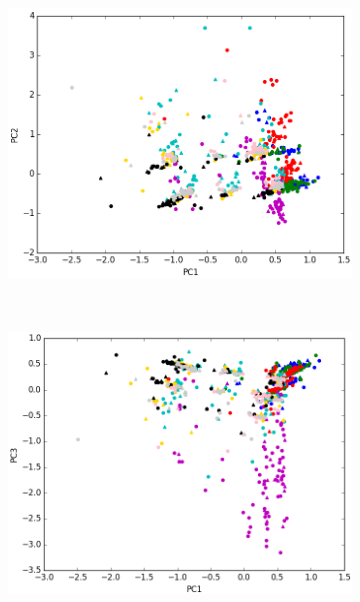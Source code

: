 \begin{figure}[ht!]	
	\begin{subfigure}[b]{0.49\textwidth}
		\includegraphics[width=\linewidth]{img/oja/3dim-pc1-pc2.png}
	\end{subfigure}%
	~
	\begin{subfigure}[b]{0.5\textwidth}
		\includegraphics[width=\linewidth]{img/oja/3dim-pc1-pc3.png}
	\end{subfigure}%

\end{figure}


